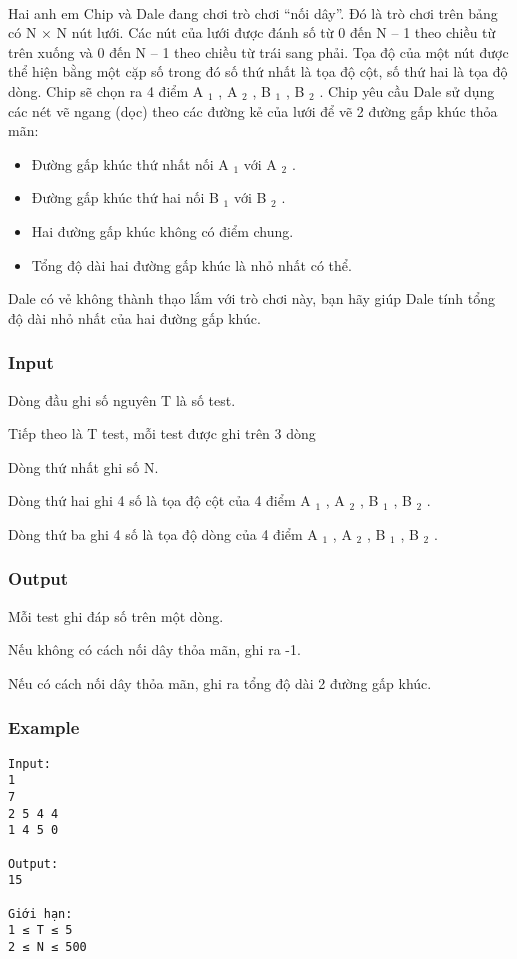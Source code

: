 

 

Hai anh em Chip và Dale đang chơi trò chơi “nối dây”. Đó là trò chơi trên bảng có N × N nút lưới. Các nút của lưới được đánh số từ 0 đến N – 1 theo chiều từ trên xuống và 0 đến N – 1 theo chiều từ trái sang phải. Tọa độ của một nút được thể hiện bằng một cặp số trong đó số thứ nhất là tọa độ cột, số thứ hai là tọa độ dòng. Chip sẽ chọn ra 4 điểm A $_ 1 $ , A $_ 2 $ , B $_ 1 $ , B $_ 2 $ . Chip yêu cầu Dale sử dụng các nét vẽ ngang (dọc) theo các đường kẻ của lưới để vẽ 2 đường gấp khúc thỏa mãn:
\begin{itemize}
	\item Đường gấp khúc thứ nhất nối A $_ 1 $ với A $_ 2 $ .
	\item Đường gấp khúc thứ hai nối B $_ 1 $ với B $_ 2 $ .
	\item Hai đường gấp khúc không có điểm chung.
	\item Tổng độ dài hai đường gấp khúc là nhỏ nhất có thể.
\end{itemize}

Dale có vẻ không thành thạo lắm với trò chơi này, bạn hãy giúp Dale tính tổng độ dài nhỏ nhất của hai đường gấp khúc.

\subsubsection{Input}

Dòng đầu ghi số nguyên T là số test.

Tiếp theo là T test, mỗi test được ghi trên 3 dòng

Dòng thứ nhất ghi số N.

Dòng thứ hai ghi 4 số là tọa độ cột của 4 điểm A $_ 1 $ , A $_ 2 $ , B $_ 1 $ , B $_ 2 $ .

Dòng thứ ba ghi 4 số là tọa độ dòng của 4 điểm A $_ 1 $ , A $_ 2 $ , B $_ 1 $ , B $_ 2 $ .

\subsubsection{Output}

Mỗi test ghi đáp số trên một dòng.

Nếu không có cách nối dây thỏa mãn, ghi ra -1.

Nếu có cách nối dây thỏa mãn, ghi ra tổng độ dài 2 đường gấp khúc.

\subsubsection{Example}
\begin{verbatim}
Input:
1
7
2 5 4 4
1 4 5 0

Output:
15

Giới hạn:
1 ≤ T ≤ 5 
2 ≤ N ≤ 500 
\end{verbatim}
